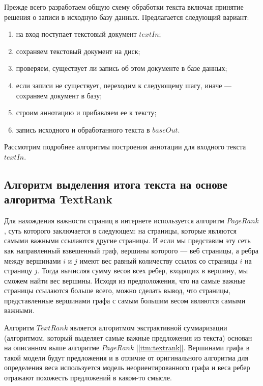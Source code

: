 Прежде всего разработаем общую схему обработки текста включая принятие решения о записи в исходную базу данных. Предлагается следующий вариант:

\begin{enumerate}
    \item на вход поступает текстовый документ $textIn$;
    \item сохраняем текстовый документ на диск;
    \item проверяем, существует ли запись об этом документе в базе данных;
    \item если записи не существует, переходим к следующему шагу, иначе --- сохраняем документ в базу;
    \item строим аннотацию и прибавляем ее к тексту;
    \item запись исходного и обработанного текста в $baseOut$.
\end{enumerate}

Рассмотрим подробнее алгоритмы построения аннотации для входного текста $textIn$. 

\subsection{Алгоритм выделения итога текста на основе алгоритма TextRank}\label{sec:textrank}

Для нахождения важности страниц в интернете используется алгоритм $PageRank$, суть которого заключается в следующем: на страницы, которые являются самыми важными ссылаются другие страницы. И если мы представим эту сеть как направленный взвешенный граф, вершины которого --- веб страницы, а ребра между вершинами $i$ и $j$ имеют вес равный количеству ссылок со страницы $i$ на страницу $j$. Тогда вычисляя сумму весов всех ребер, входящих в вершину, мы сможем найти вес вершины. Исходя из предположения, что на самые важные страницы ссылаются больше всего, можно сделать вывод, что страницы, представленные вершинами графа с самым большим весом являются самыми важными.

Алгоритм $TextRank$ является алгоритмом экстрактивной суммаризации (алгоритмом, который выделяет самые важные предложения из текста) основан на описанном выше алгоритме $PageRank$ \hyperref[itm:textrank]{[\ref{itm:textrank}]}. Вершинами графа в такой модели будут предложения и в отличие от оригинального алгоритма для определения веса используется модель неориентированного графа и веса ребер отражают похожесть предложений в каком-то смысле.

